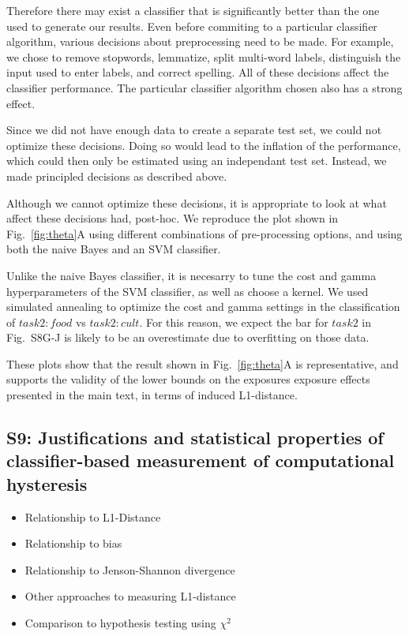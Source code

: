 \documentclass[12pt]{article}
\begin{document}
Therefore there may exist a classifier that is 
significantly better than the one used to generate our results.  Even before
commiting to a particular classifier algorithm, various decisions about
preprocessing need to be made.  For example, we chose to remove stopwords,
lemmatize, split multi-word labels, distinguish the input used to enter 
labels, and correct spelling.  All of these decisions affect the classifier
performance.  The particular classifier algorithm chosen also has a strong 
effect.

Since we did not have enough data to create a separate test set, we could not
optimize these decisions.  Doing so would lead to the inflation of the 
performance, which could then only be estimated using an independant test set.
Instead, we made principled decisions as described above.

Although we cannot optimize these decisions, it is appropriate to look at
what affect these decisions had, post-hoc.  We reproduce the plot shown in 
Fig.~\ref{fig:theta}A using different combinations of pre-processing options,
and using both the naive Bayes and an SVM classifier.

Unlike the naive Bayes classifier, it is necesarry to tune the cost and 
gamma hyperparameters of the SVM classifier, as well as choose a kernel.
We used simulated annealing to optimize the cost and gamma settings in the
classification of $task2:food$ vs $task2:cult$.  For this reason, we expect
the bar for $task2$ in Fig.~S8G-J is likely to be an overestimate due to
overfitting on those data.

These plots show that the result shown in Fig.~\ref{fig:theta}A is 
representative, and supports the validity of the lower bounds on the 
exposures exposure effects presented in the main text, in terms of induced 
L1-distance.


\subsection*{S9: Justifications and statistical properties of classifier-based measurement of computational hysteresis}
\begin{itemize}
	\item{Relationship to L1-Distance}
	\item{Relationship to bias}
	\item{Relationship to Jenson-Shannon divergence}
	\item{Other approaches to measuring L1-distance}
	\item{Comparison to hypothesis testing using $\chi^2$}
\end{itemize}
\end{document}
